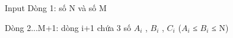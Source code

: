 Input
Dòng 1: số N và số M   


   Dòng 2...M+1: dòng i+1 chứa 3 số $A_{i}$   , $B_{i}$   , $C_{i}$   ($A_{i}$   ≤ $B_{i}$   ≤ N)